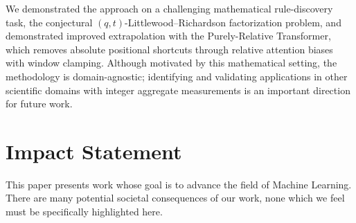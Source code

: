 \documentclass{article}
\theoremstyle{plain}
\theoremstyle{definition}
\theoremstyle{remark}
\begin{document}
We demonstrated the approach on a challenging mathematical rule-discovery task, the conjectural $(q,t)$-Littlewood--Richardson factorization problem, and demonstrated improved extrapolation with the Purely-Relative Transformer, which removes absolute positional shortcuts through relative attention biases with window clamping. Although motivated by this mathematical setting, the methodology is domain-agnostic; identifying and validating applications in other scientific domains with integer aggregate measurements is an important direction for future work.




\section*{Impact Statement}
This paper presents work whose goal is to advance the field of Machine
Learning. There are many potential societal consequences of our work, none
which we feel must be specifically highlighted here.


  


\end{document}
